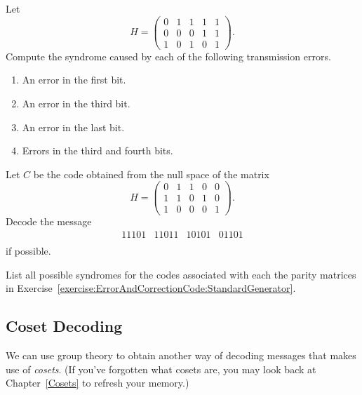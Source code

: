  \begin{exercise}{}
Let
\[
H =
\left(
\begin{array}{ccccc}
0 & 1 & 1 & 1 & 1 \\
0 & 0 & 0 & 1 & 1 \\
1 & 0 & 1 & 0 & 1
\end{array}
\right).
\]
Compute the syndrome caused by each of the following transmission
errors. 
\begin{enumerate}
 
 \bf\item\rm 
An error in the first bit.
 
 \bf\item\rm 
An error in the third bit.
 
 \bf\item\rm 
An error in the last bit.
 
 \bf\item\rm 
Errors in the third and fourth bits.
 
\end{enumerate}
 \end{exercise}
 
\begin{exercise}{}
Let $C$ be the code obtained from the null space of the matrix
\[
H =
\left(
\begin{array}{ccccc}
0 & 1 & 1 & 0 & 0 \\
1 & 1 & 0 & 1 & 0 \\
1 & 0 & 0 & 0 & 1
\end{array}
\right).
\]
Decode the message
\[
\begin{array}{cccc}
11101 & 11011 & 10101 & 01101  \\
\end{array}
\]
if possible.
\end{exercise}
 
  
\begin{exercise}{}
List all possible syndromes for the codes associated with each the parity
matrices in Exercise~\ref{exercise:ErrorAndCorrectionCode:StandardGenerator}. 
\end{exercise} 
 
\subsection{Coset Decoding}
\label{subsec:ErrorAndCorrectionCode:EfficientDecoding:CosetDecode}
 
We can use group theory to obtain another way of decoding messages that makes use of \emph{cosets}. (If you've 
forgotten what cosets are, you may look back at Chapter~\ref{Cosets} to refresh your memory.) 


